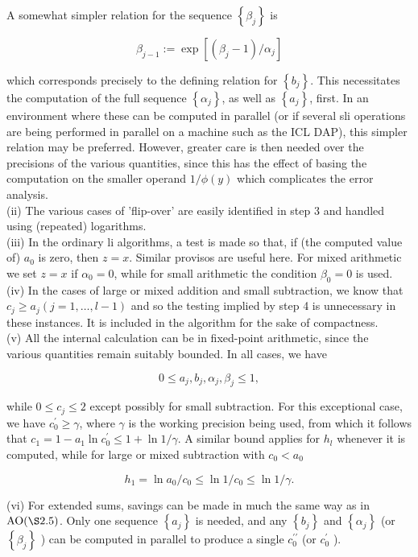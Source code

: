 \documentclass[10pt]{article}
\begin{document}
A somewhat simpler relation for the sequence $\left\{\beta_{j}\right\}$ is

$$
\beta_{j-1}:=\exp \left[\left(\beta_{j}-1\right) / \alpha_{j}\right]
$$

which corresponds precisely to the defining relation for $\left\{b_{j}\right\}$. This necessitates the computation of the full sequence $\left\{\alpha_{j}\right\}$, as well as $\left\{a_{j}\right\}$, first. In an environment where these can be computed in parallel (or if several sli operations are being performed in parallel on a machine such as the ICL DAP), this simpler relation may be preferred. However, greater care is then needed over the precisions of the various quantities, since this has the effect of basing the computation on the smaller operand $1 / \phi(y)$ which complicates the error analysis.\\
(ii) The various cases of 'flip-over' are easily identified in step 3 and handled using (repeated) logarithms.\\
(iii) In the ordinary li algorithms, a test is made so that, if (the computed value of) $a_{0}$ is zero, then $z=x$. Similar provisos are useful here. For mixed arithmetic we set $z=x$ if $\alpha_{0}=0$, while for small arithmetic the condition $\beta_{0}=0$ is used.\\
(iv) In the cases of large or mixed addition and small subtraction, we know that $c_{j} \geqslant a_{j}(j=1, \ldots, l-1)$ and so the testing implied by step 4 is unnecessary in these instances. It is included in the algorithm for the sake of compactness.\\
(v) All the internal calculation can be in fixed-point arithmetic, since the\\
various quantities remain suitably bounded. In all cases, we have

$$
0 \leqslant a_{j}, b_{j}, \alpha_{j}, \beta_{j} \leqslant 1,
$$

while $0 \leqslant c_{j} \leqslant 2$ except possibly for small subtraction. For this exceptional case, we have $c_{0}^{\prime} \geqslant \gamma$, where $\gamma$ is the working precision being used, from which it follows that $c_{1}=1-a_{1} \ln c_{0}^{\prime} \leqslant 1+\ln 1 / \gamma$. A similar bound applies for $h_{l}$ whenever it is computed, while for large or mixed subtraction with $c_{0}<a_{0}$

$$
h_{1}=\ln a_{0} / c_{0} \leqslant \ln 1 / c_{0} \leqslant \ln 1 / \gamma .
$$

(vi) For extended sums, savings can be made in much the same way as in $\mathrm{AO}(\S 2.5)$. Only one sequence $\left\{a_{j}\right\}$ is needed, and any $\left\{b_{j}\right\}$ and $\left\{\alpha_{j}\right\}$ (or $\left\{\beta_{j}\right\}$ ) can be computed in parallel to produce a single $c_{0}^{\prime \prime}$ (or $c_{0}^{\prime}$ ).
\end{document}
